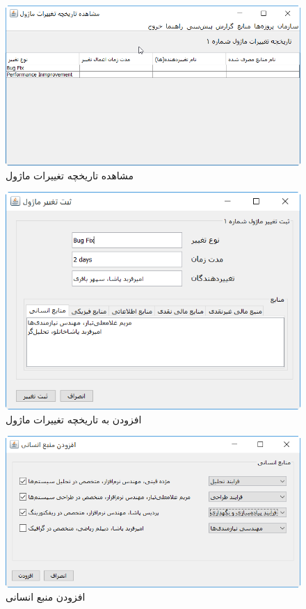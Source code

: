 \begin{figure}[H]
	\centering
	\includegraphics[scale=0.8]{img/prot/ViewModuleModificationHistory}
	\caption{مشاهده تاریخچه تغییرات ماژول}
\end{figure}
\begin{figure}[H]
	\centering
	\includegraphics[scale=0.8]{img/prot/AddModuleModification}
	\caption{افزودن به تاریخچه تغییرات ماژول}
\end{figure}
\begin{figure}[H]
	\centering
	\includegraphics[scale=0.8]{img/prot/AddHumanResource}
	\caption{افزودن منبع انسانی}
\end{figure}
